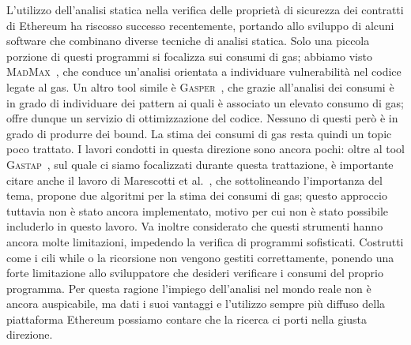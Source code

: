 L'utilizzo dell'analisi statica nella verifica delle proprietà di sicurezza dei contratti di Ethereum ha riscosso successo recentemente, portando allo sviluppo di alcuni software che combinano diverse tecniche di analisi statica. Solo una piccola porzione di questi programmi si focalizza sui consumi di gas; abbiamo visto \textsc{MadMax}~\cite{grech2018madmax}, che conduce un'analisi orientata a individuare vulnerabilità nel codice legate al gas. Un altro tool simile è \textsc{Gasper}~\cite{chen2017under}, che grazie all'analisi dei consumi è in grado di individuare dei pattern ai quali è associato un elevato consumo di gas; offre dunque un servizio di ottimizzazione del codice. Nessuno di questi però è in grado di produrre dei bound.\newline
\indent La stima dei consumi di gas resta quindi un topic poco trattato. I lavori condotti in questa direzione sono ancora pochi: oltre al tool \textsc{Gastap}~\cite{DBLP:journals/corr/abs-1811-10403}, sul quale ci siamo focalizzati durante questa trattazione, è importante citare anche il lavoro di Marescotti et al.~\cite{marescotti2018computing}, che sottolineando l'importanza del tema, propone due algoritmi per la stima dei consumi di gas; questo approccio tuttavia non è stato ancora implementato, motivo per cui non è stato possibile includerlo in questo lavoro.\newline
\indent Va inoltre considerato che questi strumenti hanno ancora molte limitazioni, impedendo la verifica di programmi sofisticati. Costrutti come i cili while o la ricorsione non vengono gestiti correttamente, ponendo una forte limitazione allo sviluppatore che desideri verificare i consumi del proprio programma. Per questa ragione l'impiego dell'analisi nel mondo reale non è ancora auspicabile, ma dati i suoi vantaggi e l'utilizzo sempre più diffuso della piattaforma Ethereum possiamo contare che la ricerca ci porti nella giusta direzione.\newline  
